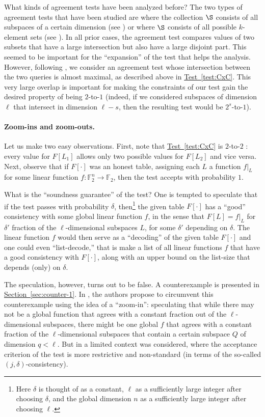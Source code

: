 \documentclass[11pt]{article}
\numberwithin{equation}{section}
\theoremstyle{definition}
\theoremstyle{plain}
\newcommand{\expref}[2]{\hyperref[#2]{#1~\ref{#2}}}
\def\F{\mathbb{F}}
\begin{document}
%

What kinds of agreement tests have been analyzed before? The two types of agreement tests that have been studied are where the collection $\S$ consists of all subspaces of a certain dimension (see \cite{RaSa,AS03,IKW}) or where $\S$ consists of all possible $k$-element sets (see \cite{DR06,DG08,IKW,DS14}). In all prior cases, the agreement test compares values of two subsets that have a large intersection but also have a large disjoint part. This seemed to be important for the ``expansion'' of the test that helps the analysis.
However, following \cite{KMS}, we consider an agreement test whose intersection between the two queries is almost maximal, as described above in \expref{Test}{test:CxC}. This very large overlap is important for making the constraints of our test gain the desired property of being $2$-to-$1$
(indeed, if we considered subspaces of dimension $\ell$ that intersect in dimension $\ell - s$, then the resulting test would be $2^s$-to-$1$).

\paragraph{Zoom-ins and zoom-outs.} Let us make two easy observations. First, note that
\expref{Test}{test:CxC} is $2$-to-$2$ : every value for $F[L_1]$ allows only two possible values for $F[L_2]$ and vice versa. Next, observe that if $F[\cdot]$ was an honest table, assigning each $L$ a function $f|_L$ for some linear function $f:\F_2^n\to\F_2$, then the test accepts with probability $1$.

What is the ``soundness guarantee'' of the test? One is tempted to speculate that
if the test passes with probability $\delta$, then\footnote{Here $\delta$ is
  thought of as a constant, $\ell$ as a sufficiently large integer after
  choosing $\delta$, and the global dimension $n$ as a sufficiently large
  integer after choosing $\ell$.}  the given table $F[\cdot]$ has a ``good''
consistency with some global linear function $f$, in the sense that $F[L]= f|_L$
for $\delta'$ fraction of the $\ell$-dimensional subspaces $L$, for some
$\delta'$ depending on $\delta$. The linear function $f$ would then serve as a
``decoding'' of the given table $F[\cdot]$ and one could even ``list-decode,''
that is make a list of all linear functions $f$ that have a good consistency with
$F[\cdot]$, along with an upper bound on the list-size that depends (only) on
$\delta$.

\medskip The speculation, however, turns out to be false. A counterexample is
presented in \expref{Section}{sec:counter-1}. In \cite{KMS}, the authors propose to
circumvent this counterexample using the idea of a ``zoom-in'': speculating that
while there may not be a global function that agrees with a constant fraction
out of the $\ell$-dimensional subspaces, there might be one global $f$ that
agrees with a constant fraction of the $\ell$-dimensional subspaces that contain
a certain subspace $Q$ of dimension $q<\ell$. But in \cite{KMS} a limited
context was considered, where the acceptance criterion of the test is more
restrictive and non-standard (in terms of the so-called
$(j,\delta)$-consistency).
\end{document}
